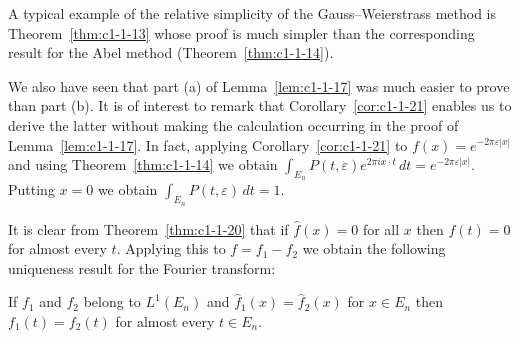 A typical example of the relative simplicity of the Gauss--Weierstrass method is
Theorem~\ref{thm:c1-1-13} whose proof is much simpler than the corresponding
result for the Abel method (Theorem~\ref{thm:c1-1-14}).

We also have seen that part (a) of Lemma~\ref{lem:c1-1-17} was much easier to
prove than part (b). It is of interest to remark that
Corollary~\ref{cor:c1-1-21} enables us to derive the latter without making the
calculation occurring in the proof of Lemma~\ref{lem:c1-1-17}. In fact, applying
Corollary~\ref{cor:c1-1-21} to $f(x) = e^{-2\pi\varepsilon|x|}$ and using
Theorem~\ref{thm:c1-1-14} we obtain
$\int_{E_{n}} P(t, \varepsilon)e^{2\pi i x \cdot t} \, dt = e^{-2\pi\varepsilon|x|}$.
Putting $x = 0$ we obtain $\int_{E_{n}} P(t, \varepsilon) \, dt = 1$.

It is clear from Theorem~\ref{thm:c1-1-20} that if $\hat{f}(x) = 0$ for all $x$
then $f(t) = 0$ for almost every $t$. Applying this to $f = f_{1} - f_{2}$ we
obtain the following uniqueness result for the Fourier transform:

\begin{corollary}\label{cor:c1-1-22}
If $f_{1}$ and $f_{2}$ belong to $L^{1}(E_{n})$ and
$\hat{f}_{1}(x) = \hat{f}_{2}(x)$ for $x \in E_{n}$ then $f_{1}(t) = f_{2}(t)$
for almost every $t \in E_{n}$.
\end{corollary}

